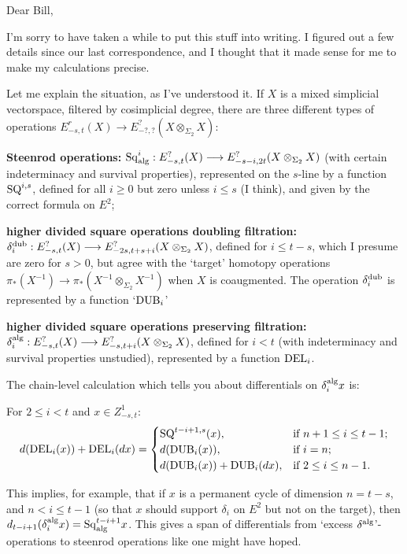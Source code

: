 \documentclass[10pt]{article}
\newcommand{\Sq}{\mathrm{Sq}}
\begin{document}
\begin{letter to Dwyer}

\noindent Dear Bill,

I'm sorry to have taken a while to put this stuff into writing. I figured out a few details since our last correspondence, and I thought that it made sense for me to make my calculations precise.

Let me explain the situation, as I've understood it. If $X$ is a mixed simplicial vectorspace, filtered by cosimplicial degree, there are three different types of operations $E^r_{-s,t}(X)\to E^?_{-?,?}(X\otimes_{\Sigma_2}X)$:
\begin{itemise}
\setlength{\parindent}{.25in}
\item \textbf{Steenrod operations:} $\Sq^i_\textup{alg}:E^?_{-s,t}(X)\to E^?_{-s-i,2t}(X\otimes_{\Sigma_2}X)$ (with certain indeterminacy and survival properties), represented on the $s$-line by a function $\textup{SQ}^{i,s}$, defined for all $i\geq0$ but zero unless $i\leq s$ (I think), and given by the correct formula on $E^2$;
\item \textbf{higher divided square operations doubling filtration:} $\delta_i^\textup{dub}:E^?_{-s,t}(X)\to E^?_{-2s,t+s+i}(X\otimes_{\Sigma_2}X)$, defined for $i\leq t-s$, which I presume are zero for $s>0$, but agree with the `target' homotopy operations $\pi_*(X^{-1})\to \pi_*(X^{-1}\otimes_{\Sigma_2}X^{-1})$ when $X$ is coaugmented. The operation $\delta_i^\textup{dub}$ is represented by a function `$\textup{DUB}_i$'
\item \textbf{higher divided square operations preserving filtration:}
$\delta_i^\textup{alg}:E^?_{-s,t}(X)\to E^?_{-s,t+i}(X\otimes_{\Sigma_2}X)$, defined for $i<t$ (with indeterminacy and survival properties unstudied), represented by a function $\textup{DEL}_{i}$.
\end{itemise}
The chain-level calculation which tells you about differentials on $\delta_i^\textup{alg}x$ is:
\begin{prop*}
For $2\leq i<t$ and $x\in Z^1_{-s,t}$:
\[d(\textup{DEL}_i(x))+ \textup{DEL}_i(dx)=\begin{cases}
\textup{SQ}^{t-i+1,s}(x),&\textup{if }n+1\leq i \leq t-1;\\
d(\textup{DUB}_i(x)),&\textup{if }i=n;\\
d(\textup{DUB}_i(x))+\textup{DUB}_i(dx),&\textup{if }2\leq i\leq n-1.
\end{cases}\]
\end{prop*}
This implies, for example, that if $x$ is a permanent cycle of dimension $n=t-s$, and $n<i\leq t-1$ (so that $x$ should support $\delta_i$ on $E^2$ but not on the target), then $d_{t-i+1}(\delta_i^\textup{alg}x)=\Sq^{t-i+1}_\textup{alg}x$. This gives a span of differentials from `excess $\delta^\textup{alg}$'-operations to steenrod operations like one might have hoped.


\end{letter to Dwyer}
\end{document}
